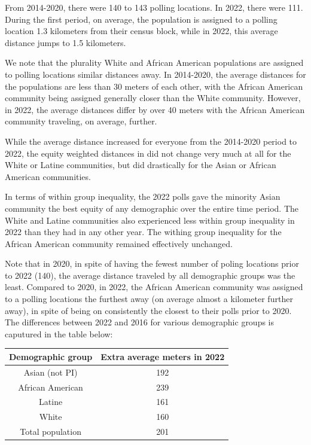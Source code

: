 \documentclass[11pt]{article}
\theoremstyle{remark}
\theoremstyle{definition}
\begin{document}
From 2014-2020, there were 140 to 143 polling locations. In 2022, there were 111. During the first period, on average, the population is assigned to a polling location 1.3 kilometers from their census block, while in 2022, this average distance jumps to 1.5 kilometers. 

We note that the plurality White and African American populations are assigned to polling locations similar distances away. In 2014-2020, the average distances for the populations are less than 30 meters of each other, with the African American community being assigned generally closer than the White community. However, in 2022, the average distances differ by over 40 meters with the African American community traveling, on average, further. 

While the average distance increased for everyone from the 2014-2020 period to 2022, the equity weighted distances in did not change very much at all for the White or Latine communities, but did drastically for the Asian or African American communities. 

In terms of within group inequality, the 2022 polls gave the minority Asian community the best equity of any demographic over the entire time period. The White and Latine communities also experienced less within group inequality in 2022 than they had in any other year. The withing group inequality for the African American community remained effectively unchanged. 

Note that in 2020, in spite of having the fewest number of poling locations prior to 2022 (140), the average distance traveled by all demographic groups was the least. Compared to 2020, in 2022,
the African American community was assigned to a polling locations the furthest away (on average almost a kilometer further away), in spite of being on consistently the closest to their polls prior to 2020. The differences between 2022 and 2016 for various demographic groups is caputured in the table below:

\begin{tabular}{|c|c|}
	\hline
	Demographic group & Extra average meters in 2022 \\ \hline
	Asian (not PI) &   192 \\ \hline
	African American &   239  \\ \hline
	Latine & 161 \\ \hline
	White &  160\\ \hline
	Total population &  201\\ \hline
\end{tabular}
\end{document}

